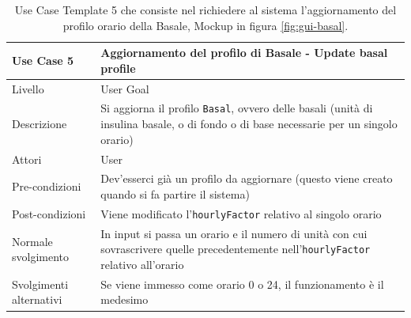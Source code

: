 \documentclass[twocolumn]{article}
\begin{document}
\begin{table}
    \centering
    \captionsetup{justification=centering}
    \begin{tabular}{|p{4.5cm}|p{9.5cm}|}
        \hline
        Use Case 5 & Aggiornamento del profilo di Basale - Update basal profile\\
        \hline
        Livello & User Goal \\
        \hline
        Descrizione & Si aggiorna il profilo \texttt{Basal}, ovvero delle basali (unità di insulina basale, o di fondo o di base necessarie per un singolo orario)\\
        \hline
        Attori & User \\
        \hline
        Pre-condizioni & Dev'esserci già un profilo da aggiornare (questo viene creato quando si fa partire il sistema)\\
        \hline
        Post-condizioni & Viene modificato l'\texttt{hourlyFactor} relativo al singolo orario\\
        \hline
        Normale svolgimento & In input si passa un orario e il numero di unità con cui sovrascrivere quelle precedentemente nell'\texttt{hourlyFactor} relativo all'orario\\
        \hline
        Svolgimenti alternativi & Se viene immesso come orario 0 o 24, il funzionamento è il medesimo\\
        \hline
    \end{tabular}
    \caption{Use Case Template 5 che consiste nel richiedere al sistema l'aggiornamento del profilo orario della Basale, Mockup in figura \ref{fig:gui-basal}.}
    \label{tab:uc5}
\end{table}
\end{document}
